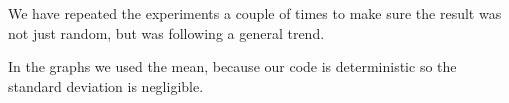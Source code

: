We have repeated the experiments a couple of times to make sure the result was not just random, 
but was following a general trend. 

In the graphs we used the mean, because our code is deterministic so the standard deviation is negligible.
